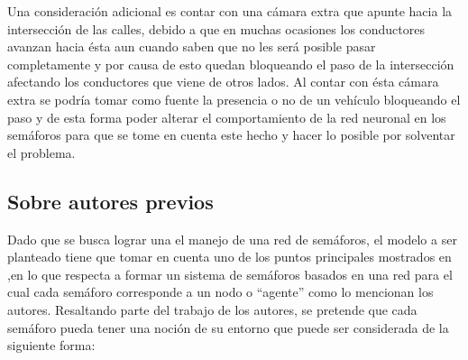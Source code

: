Una consideraci\'{o}n adicional es contar con una c\'{a}mara extra que apunte hacia la intersecci\'{o}n de las calles, debido a que en muchas ocasiones los conductores avanzan hacia \'{e}sta aun cuando saben que no les ser\'{a} posible pasar completamente y por causa de esto quedan bloqueando el paso de la intersecci\'{o}n afectando los conductores que viene de otros lados. Al contar con \'{e}sta c\'{a}mara extra se podr\'{i}a tomar como fuente la presencia o no de un veh\'{i}culo bloqueando el paso y de esta forma poder alterar el comportamiento de la red neuronal en los sem\'{a}foros para que se tome en cuenta este hecho y hacer lo posible por solventar el problema.


\subsection{Sobre autores previos}

Dado que se busca lograr una el manejo de una red de sem\'{a}foros, el modelo a ser planteado tiene que tomar en cuenta uno de los puntos principales mostrados en \cite{Srinivasan2006} %
,en lo que respecta a formar un sistema de sem\'{a}foros basados en una red para el cual cada sem\'{a}foro corresponde a un nodo o “agente” como lo mencionan los autores. Resaltando parte del trabajo de los autores, se pretende que cada sem\'{a}foro pueda tener una noci\'{o}n de su entorno que puede ser considerada de la siguiente forma:

